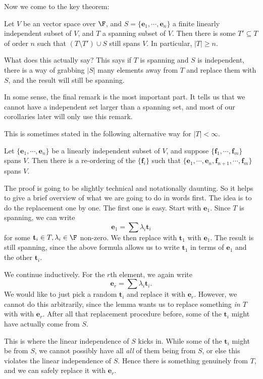 \documentclass[a4paper]{article}
\begin{document}
Now we come to the key theorem:
\begin{thm}
  Let $V$ be an vector space over $\F$, and $S = \{\mathbf{e}_1, \cdots, \mathbf{e}_n\}$ a finite linearly independent subset of $V$, and $T$ a spanning subset of $V$. Then there is some $T'\subseteq T$ of order $n$ such that $(T\setminus T') \cup S$ still spans $V$. In particular, $|T| \geq n$.
\end{thm}
What does this actually say? This says if $T$ is spanning and $S$ is independent, there is a way of grabbing $|S|$ many elements away from $T$ and replace them with $S$, and the result will still be spanning.

In some sense, the final remark is the most important part. It tells us that we cannot have a independent set larger than a spanning set, and most of our corollaries later will only use this remark.

This is sometimes stated in the following alternative way for $|T| < \infty$.
\begin{cor}
  Let $\{\mathbf{e}_1, \cdots, \mathbf{e}_n\}$ be a linearly independent subset of $V$, and suppose $\{\mathbf{f}_1, \cdots, \mathbf{f}_m\}$ spans $V$. Then there is a re-ordering of the $\{\mathbf{f}_i\}$ such that $\{\mathbf{e}_1,\cdots, \mathbf{e}_n, \mathbf{f}_{n + 1}, \cdots, \mathbf{f}_m\}$ spans $V$.
\end{cor}

The proof is going to be slightly technical and notationally daunting. So it helps to give a brief overview of what we are going to do in words first. The idea is to do the replacement one by one. The first one is easy. Start with $\mathbf{e}_1$. Since $T$ is spanning, we can write
\[
  \mathbf{e}_1 = \sum \lambda_i \mathbf{t}_i
\]
for some $\mathbf{t}_i \in T, \lambda_i \in \F$ non-zero. We then replace with $\mathbf{t}_1$ with $\mathbf{e}_1$. The result is still spanning, since the above formula allows us to write $\mathbf{t}_1$ in terms of $\mathbf{e}_1$ and the other $\mathbf{t}_i$.

We continue inductively. For the $r$th element, we again write
\[
  \mathbf{e}_r = \sum \lambda_i \mathbf{t}_i.
\]
We would like to just pick a random $\mathbf{t}_i$ and replace it with $\mathbf{e}_r$. However, we cannot do this arbitrarily, since the lemma wants us to replace something \emph{in $T$} with with $\mathbf{e}_r$. After all that replacement procedure before, some of the $\mathbf{t}_i$ might have actually come from $S$.

This is where the linear independence of $S$ kicks in. While some of the $\mathbf{t}_i$ might be from $S$, we cannot possibly have all \emph{all} of them being from $S$, or else this violates the linear independence of $S$. Hence there is something genuinely from $T$, and we can safely replace it with $\mathbf{e}_r$.
\end{document}
